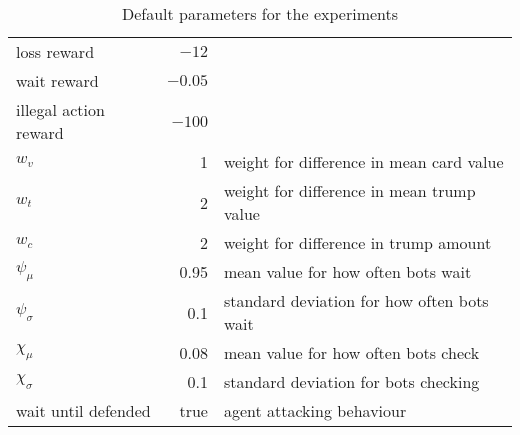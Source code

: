 \documentclass[a4paper,titlepage]{article}
\begin{document}
\begin{table}[h]
\begin{tabular}{lrl}
    loss reward & ${-12}$ \\
    wait reward & $-0.05$ \\
    illegal action reward & $-100$ \\
    $w_v$ & 1 & weight for difference in mean card value \\
    $w_t$ & 2 & weight for difference in mean trump value \\
    $w_c$ & 2 & weight for difference in trump amount \\
    $\psi_\mu$ & 0.95 & mean value for how often bots wait \\
    $\psi_\sigma$ & 0.1 & standard deviation for how often bots wait \\
    $\chi_\mu$ & 0.08 & mean value for how often bots check \\
    $\chi_\sigma$ & 0.1 & standard deviation for bots checking \\
    wait until defended & true & agent attacking behaviour \\
    \bottomrule
  \end{tabular}
  \caption{Default parameters for the experiments}
  \label{table:parameters}
\end{table}

\newpage
\end{document}
